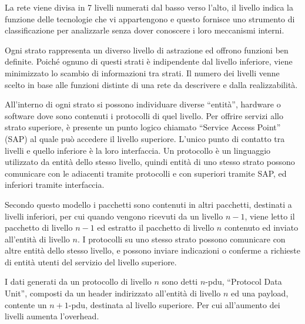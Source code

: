 \documentclass{article}
\numberwithin{equation}{subsection}
\begin{document}
La rete viene divisa in 7 livelli numerati dal basso verso l'alto, il livello indica la funzione delle tecnologie che vi appartengono e questo fornisce uno strumento di 
classificazione per analizzarle senza dover conoscere i loro meccanismi interni. 


Ogni strato rappresenta un diverso livello di astrazione ed offrono funzioni ben definite. Poiché ognuno di questi strati è indipendente dal livello inferiore, viene minimizzato lo scambio 
di informazioni tra strati. Il numero dei livelli venne scelto in base alle funzioni distinte di una rete da descrivere e dalla realizzabilità. 

All'interno di ogni strato si possono individuare diverse ``entità'', hardware o software dove sono contenuti i protocolli di quel livello. Per offrire servizi allo 
strato superiore, è presente un punto logico chiamato ``Service Access Point'' (SAP) al quale può accedere il livello superiore. 
L'unico punto di contatto tra livelli e quello inferiore è la loro interfaccia. Un protocollo è un linguaggio utilizzato da entità dello stesso livello, quindi entità 
di uno stesso strato possono comunicare con le adiacenti tramite protocolli e con superiori tramite SAP, ed inferiori tramite interfaccia. 

Secondo questo modello i pacchetti sono contenuti in altri pacchetti, destinati a livelli inferiori, per cui quando vengono ricevuti da un livello $n-1$, viene letto 
il pacchetto di livello $n-1$ ed estratto il pacchetto di livello $n$ contenuto ed inviato all'entità di livello $n$. 
I protocolli su uno stesso strato possono comunicare con altre entità dello stesso livello, e possono inviare indicazioni o conferme a richieste di entità utenti del 
servizio del livello superiore. 

I dati generati da un protocollo di livello $n$ sono detti $n$-pdu, ``Protocol Data Unit'', composti da un header indirizzato all'entità di livello $n$ ed una payload, 
contente un $n+1$-pdu, destinata al livello superiore. Per cui all'aumento dei livelli aumenta l'overhead. 
\end{document}
